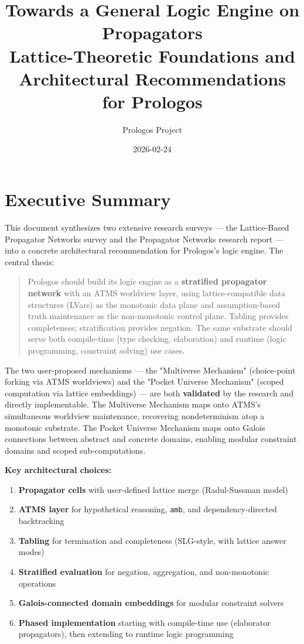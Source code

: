 \documentclass[11pt]{article}
\author{Prologos Project}
\date{2026-02-24}
\title{Towards a General Logic Engine on Propagators\\\medskip
\large Lattice-Theoretic Foundations and Architectural Recommendations for Prologos}
\begin{document}
\maketitle
\tableofcontents

\section{Executive Summary}
\label{sec:org7243b99}

This document synthesizes two extensive research surveys --- the Lattice-Based
Propagator Networks survey and the Propagator Networks research report --- into
a concrete architectural recommendation for Prologos's logic engine. The
central thesis:

\begin{quote}
Prologos should build its logic engine as a \textbf{stratified propagator network}
with an ATMS worldview layer, using lattice-compatible data structures (LVars)
as the monotonic data plane and assumption-based truth maintenance as the
non-monotonic control plane. Tabling provides completeness; stratification
provides negation. The same substrate should serve both compile-time
(type checking, elaboration) and runtime (logic programming, constraint
solving) use cases.
\end{quote}

The two user-proposed mechanisms --- the "Multiverse Mechanism" (choice-point
forking via ATMS worldviews) and the "Pocket Universe Mechanism" (scoped
computation via lattice embeddings) --- are both \textbf{validated} by the research
and directly implementable. The Multiverse Mechanism maps onto ATMS's
simultaneous worldview maintenance, recovering nondeterminism atop a
monotonic substrate. The Pocket Universe Mechanism maps onto Galois
connections between abstract and concrete domains, enabling modular
constraint domains and scoped sub-computations.

\textbf{Key architectural choices:}

\begin{enumerate}
\item \textbf{Propagator cells} with user-defined lattice merge (Radul-Sussman model)
\item \textbf{ATMS layer} for hypothetical reasoning, \texttt{amb}, and dependency-directed backtracking
\item \textbf{Tabling} for termination and completeness (SLG-style, with lattice answer modes)
\item \textbf{Stratified evaluation} for negation, aggregation, and non-monotonic operations
\item \textbf{Galois-connected domain embeddings} for modular constraint solvers
\item \textbf{Phased implementation} starting with compile-time use (elaborator propagators),
then extending to runtime logic programming
\end{enumerate}
\end{document}
